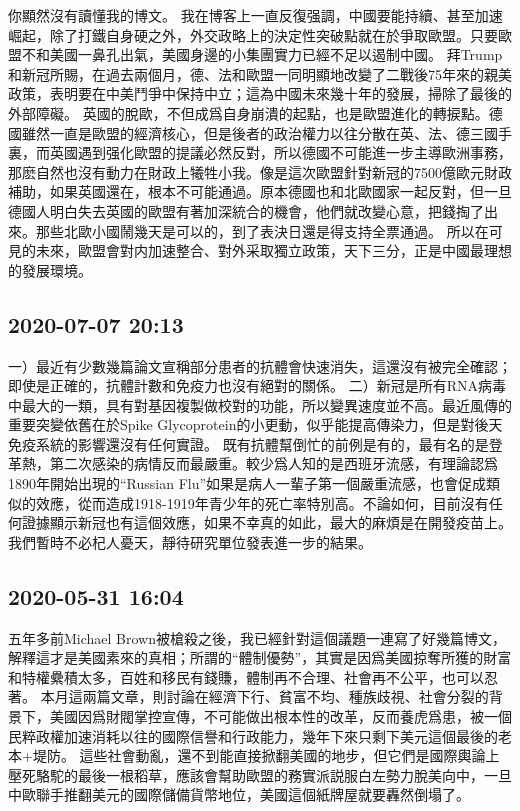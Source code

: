 \documentclass[twocolumn]{ctexart}
\begin{document}
你顯然沒有讀懂我的博文。
我在博客上一直反復强調，中國要能持續、甚至加速崛起，除了打鐵自身硬之外，外交政略上的決定性突破點就在於爭取歐盟。只要歐盟不和美國一鼻孔出氣，美國身邊的小集團實力已經不足以遏制中國。
拜Trump和新冠所賜，在過去兩個月，德、法和歐盟一同明顯地改變了二戰後75年來的親美政策，表明要在中美鬥爭中保持中立；這為中國未來幾十年的發展，掃除了最後的外部障礙。
英國的脫歐，不但成爲自身崩潰的起點，也是歐盟進化的轉捩點。德國雖然一直是歐盟的經濟核心，但是後者的政治權力以往分散在英、法、德三國手裏，而英國遇到强化歐盟的提議必然反對，所以德國不可能進一步主導歐洲事務，那麽自然也沒有動力在財政上犧牲小我。像是這次歐盟針對新冠的7500億歐元財政補助，如果英國還在，根本不可能通過。原本德國也和北歐國家一起反對，但一旦德國人明白失去英國的歐盟有著加深統合的機會，他們就改變心意，把錢掏了出來。那些北歐小國鬧幾天是可以的，到了表決日還是得支持全票通過。
所以在可見的未來，歐盟會對内加速整合、對外采取獨立政策，天下三分，正是中國最理想的發展環境。
\subsection*{2020-07-07 20:13}

一）最近有少數幾篇論文宣稱部分患者的抗體會快速消失，這還沒有被完全確認；即使是正確的，抗體計數和免疫力也沒有絕對的關係。 
二）新冠是所有RNA病毒中最大的一類，具有對基因複製做校對的功能，所以變異速度並不高。最近風傳的重要突變依舊在於Spike Glycoprotein的小更動，似乎能提高傳染力，但是對後天免疫系統的影響還沒有任何實證。 
既有抗體幫倒忙的前例是有的，最有名的是登革熱，第二次感染的病情反而最嚴重。較少爲人知的是西班牙流感，有理論認爲1890年開始出現的“Russian Flu”如果是病人一輩子第一個嚴重流感，也會促成類似的效應，從而造成1918-1919年青少年的死亡率特別高。不論如何，目前沒有任何證據顯示新冠也有這個效應，如果不幸真的如此，最大的麻煩是在開發疫苗上。我們暫時不必杞人憂天，靜待研究單位發表進一步的結果。
\subsection*{2020-05-31 16:04}

五年多前Michael Brown被槍殺之後，我已經針對這個議題一連寫了好幾篇博文，解釋這才是美國素來的真相；所謂的“體制優勢”，其實是因爲美國掠奪所獲的財富和特權纍積太多，百姓和移民有錢賺，體制再不合理、社會再不公平，也可以忍著。
本月這兩篇文章，則討論在經濟下行、貧富不均、種族歧視、社會分裂的背景下，美國因爲財閥掌控宣傳，不可能做出根本性的改革，反而養虎爲患，被一個民粹政權加速消耗以往的國際信譽和行政能力，幾年下來只剩下美元這個最後的老本+堤防。
這些社會動亂，還不到能直接掀翻美國的地步，但它們是國際輿論上壓死駱駝的最後一根稻草，應該會幫助歐盟的務實派説服白左勢力脫美向中，一旦中歐聯手推翻美元的國際儲備貨幣地位，美國這個紙牌屋就要轟然倒塌了。
\end{document}
